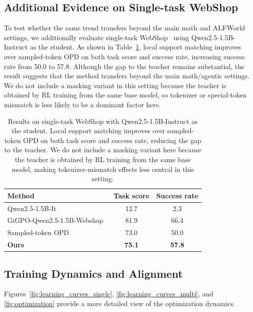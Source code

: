 \documentclass{article}
\begin{document}
\subsection{Additional Evidence on Single-task WebShop}
\label{app:webshop}


To test whether the same trend transfers beyond the main math and ALFWorld settings, we additionally evaluate single-task WebShop~\citep{webshop2023} using Qwen2.5-1.5B-Instruct as the student. As shown in Table~\ref{tab:webshop}, local support matching improves over sampled-token OPD on both task score and success rate, increasing success rate from 50.0 to 57.8. Although the gap to the teacher remains substantial, the result suggests that the method transfers beyond the main math/agentic settings. We do not include a masking variant in this setting because the teacher is obtained by RL training from the same base model, so tokenizer or special-token mismatch is less likely to be a dominant factor here.

\begin{table}[ht]
    \centering
    \small
    \begin{tabular}{lcc}
    \toprule
         \textbf{Method} & \textbf{Task score} & \textbf{Success rate} \\
    \midrule
    Qwen2.5-1.5B-It & 12.7 & 2.3 \\
    GiGPO-Qwen2.5-1.5B-Webshop~\citep{gigpo2025} & 81.9 & 66.4 \\
    Sampled-token OPD & 73.0 & 50.0 \\
    \textbf{Ours} & \textbf{75.1} & \textbf{57.8} \\
    \bottomrule
    \end{tabular}
    \caption{Results on single-task WebShop with Qwen2.5-1.5B-Instruct as the student. Local support matching improves over sampled-token OPD on both task score and success rate, reducing the gap to the teacher. We do not include a masking variant here because the teacher is obtained by RL training from the same base model, making tokenizer-mismatch effects less central in this setting.}
    \label{tab:webshop}
\end{table}

\subsection{Training Dynamics and Alignment}
\label{app:dynamics}


Figures~\ref{fig:learning_curves_single}, \ref{fig:learning_curves_multi}, and \ref{fig:optimization} provide a more detailed view of the optimization dynamics.
\end{document}
